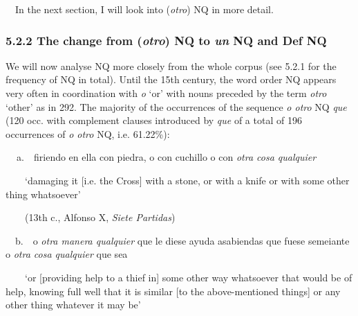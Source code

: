 \begin{styleStandard}
\ \ In the next section, I will look into (\textit{otro}) NQ\textit{ }in more detail. 
\end{styleStandard}

\subsubsection[5.2.2 The change from (otro) NQ to un NQ and Def NQ]{\textbf{5.2.2 The change from (}\textbf{\textit{otro}}\textbf{)}\textbf{\textit{ }}\textbf{NQ to }\textbf{\textit{un }}\textbf{NQ}\textbf{\textit{ }}\textbf{and Def NQ}}
\begin{styleStandard}
We will now analyse NQ more closely from the whole corpus (see 5.2.1 for the frequency of NQ in total). Until the 15th century, the word order NQ appears very often in coordination with \textit{o} ‘or’ with nouns preceded by the term \textit{otro }‘other’ as in 292. The majority of the occurrences of the sequence \textit{o otro }NQ \textit{que} (120 occ. with complement clauses introduced by \textit{que} of a total of 196 occurrences of \textit{o otro }NQ, i.e. 61.22\%):
\end{styleStandard}

\begin{styleStandard}
\textbf{\ \ }a.\ \ firiendo en ella con piedra, o con cuchillo o con \textit{otra cosa qualquier} 
\end{styleStandard}

\begin{styleStandard}
\ \ \ \ ‘damaging it [i.e. the Cross] with a stone, or with a knife or with some other thing whatsoever’
\end{styleStandard}

\begin{styleStandard}
\ \ \ \ (13th c., Alfonso X, \textit{Siete Partidas})
\end{styleStandard}

\begin{styleStandard}
\ \ b.\ \ o \textit{otra manera qualquier} que le diese ayuda asabiendas que fuese semeiante o \textit{otra cosa qualquier }que sea 
\end{styleStandard}

\begin{styleStandard}
\ \ \ \ ‘or [providing help to a thief in] some other way whatsoever that would be of help, knowing full well that it is similar [to the above-mentioned things] or any other thing whatever it may be’
\end{styleStandard}

